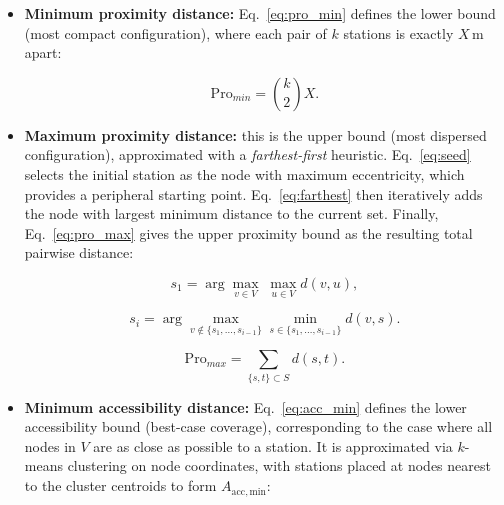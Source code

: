         \begin{itemize}
            \item \textbf{Minimum proximity distance:} Eq.~\ref{eq:pro_min} defines the lower bound (most compact configuration), where each pair of \(k\) stations is exactly \(X\)\,m apart:
                
            \begin{equation}
                \mathrm{Pro}_{min} =  \binom{k}{2}X.
                  \label{eq:pro_min}
                \end{equation}
          
            \item \textbf{Maximum proximity distance:} this is the upper bound (most dispersed configuration), approximated with a \textit{farthest-first} heuristic. Eq.~\ref{eq:seed} selects the initial station as the node with maximum eccentricity, which provides a peripheral starting point. Eq.~\ref{eq:farthest} then iteratively adds the node with largest minimum distance to the current set. Finally, Eq.~\ref{eq:pro_max} gives the upper proximity bound as the resulting total pairwise distance:
              
              \begin{equation}
                s_{1} = \arg\max_{v\in V}\;\max_{u\in V} d(v,u),
                \label{eq:seed}
              \end{equation}
            
              \begin{equation}
                s_i = \arg\max_{v \notin \{s_1,\dots,s_{i-1}\}} \min_{s \in \{s_1,\dots,s_{i-1}\}} d(v,s).
                \label{eq:farthest}
              \end{equation}
              
              \begin{equation}
                \mathrm{Pro}_{max} = \sum_{\{s,t\} \subset S} d(s,t).
                \label{eq:pro_max}
              \end{equation}
          
            \item \textbf{Minimum accessibility distance:} Eq.~\ref{eq:acc_min} defines the lower accessibility bound (best-case coverage), corresponding to the case where all nodes in \(V\) are as close as possible to a station. It is approximated via \(k\)-means clustering on node coordinates, with stations placed at nodes nearest to the cluster centroids to form \(A_{\mathrm{acc,min}}\):
            

\end{itemize}
